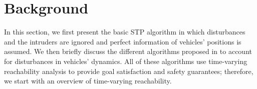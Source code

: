 \section{Background \label{sec:background}}
In this section, we first present the basic STP algorithm \cite{Chen15c} in which disturbances and the intruders are ignored and perfect information of vehicles' positions is assumed. We then briefly discuss the different algorithms proposed in \cite{Bansal2017} to account for disturbances in vehicles' dynamics. All of these algorithms use time-varying reachability analysis to provide goal satisfaction and safety guarantees; therefore, we start with an overview of time-varying reachability.

%

